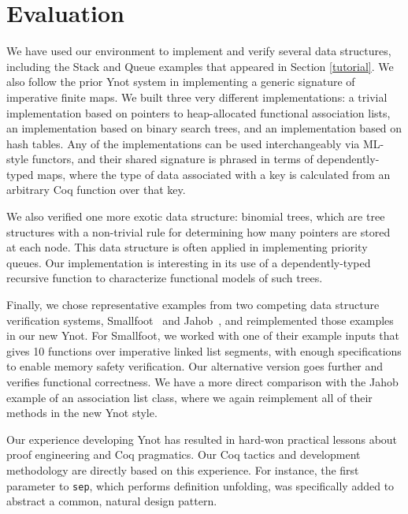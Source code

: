 \documentclass[preprint,nocopyrightspace]{sigplanconf}
\begin{document}

\section{Evaluation}

We have used our environment to implement and verify several data
structures, including the Stack and Queue examples that appeared in
Section \ref{tutorial}.  We also follow the prior Ynot system in
implementing a generic signature of imperative finite maps.  We built
three very different implementations: a trivial
implementation based on pointers to heap-allocated functional
association lists, an implementation based on binary search trees, and
an implementation based on hash tables.  Any of the implementations
can be used interchangeably via ML-style functors, and their shared
signature is phrased in terms of dependently-typed maps, where the
type of data associated with a key is calculated from an arbitrary
Coq function over that key.

We also verified one more exotic data structure: binomial trees, which
are tree structures with a non-trivial rule for determining how many
pointers are stored at each node.  This data structure is often
applied in implementing priority queues.  Our implementation is
interesting in its use of a dependently-typed recursive function to
characterize functional models of such trees.

Finally, we chose representative examples from two competing data
structure verification systems, Smallfoot~\cite{smallfoot} and
Jahob~\cite{jahob}, and reimplemented those examples in our new Ynot.
For Smallfoot, we worked with one of their example inputs that gives
10 functions over imperative linked list segments, with enough
specifications to enable memory safety verification.  Our alternative
version goes further and verifies functional correctness.  We have a
more direct comparison with the Jahob example of an association list
class, where we again reimplement all of their methods in the new Ynot
style.

Our experience developing Ynot has resulted in hard-won practical
lessons about proof engineering and Coq pragmatics.  Our Coq tactics
and development methodology are directly based on this experience.
For instance, the first parameter to {\tt sep}, which performs
definition unfolding, was specifically added to abstract a common,
natural design pattern.
\end{document}
